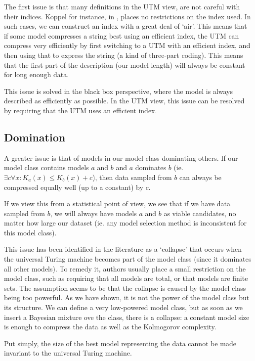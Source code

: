 \documentclass{style/llncs}
\begin{document}
The first issue is that many definitions in the UTM view, are not careful with their indices. Koppel for instance, in \cite{koppelSoph1988}, places no restrictions on the index used. In such cases, we can construct an index with a great deal of `air'. This means that if some model compresses a string best using an efficient index, the UTM can compress very efficiently by first switching to a UTM with an efficient index, and then using that to express the string (a kind of three-part coding). This means that the first part of the description (our model length) will always be constant for long enough data.

This issue is solved in the black box perspective, where the model is always described as efficiently as possible. In the UTM view, this issue can be resolved by requiring that the UTM uses an efficient index.

\subsection{Domination}

A greater issue is that of models in our model class dominating others. If our model class contains models $a$ and $b$ and $a$ dominates $b$ (ie. $\exists c \forall x :K_a(x) \leq K_b(x) + c $), then data sampled from $b$ can always be compressed equally well (up to a constant) by $c$.

If we view this from a statistical point of view, we see that if we have data sampled from $b$, we will always have models $a$ and $b$ as viable candidates, no matter how large our dataset (ie. any model selection method is inconsistent for this model class).

This issue has been identified in the literature as a `collapse' that occurs when the universal Turing machine becomes part of the model class (since it dominates all other models). To remedy it, authors usually place a small restriction on the model class, such as requiring that all models are total, or that models are finite sets. The assumption seems to be that the collapse is caused by the model class being too powerful. As we have shown, it is not the power of the model class but its structure. We can define a very low-powered model class, but as soon as we insert a Bayesian mixture ove the class, there is a collapse: a constant model size is enough to compress the data as well as the Kolmogorov complexity.  

Put simply, the size of the best model representing the data cannot be made invariant to the universal Turing machine. 
\end{document}
